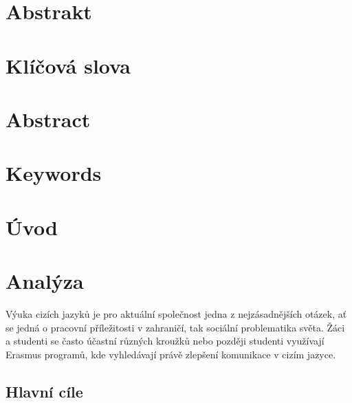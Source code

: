 \documentclass[a4paper,11pt,titlepage,fleqn]{article}
\begin{document}


\setcounter{page}{3}

\newpage
\thispagestyle{plain}
\section*{Abstrakt}

\section*{Klíčová slova}

\thispagestyle{empty}
\newpage

\section*{Abstract}

\section*{Keywords}

\thispagestyle{empty}

\newpage
\setcounter{tocdepth}{2}
\tableofcontents

\newpage
\listoffigures
\listoftables
\lstlistoflistings

\newpage
\printglossary[type=\acronymtype,title=Seznam zkratek]
\cleardoublepage


\section{Úvod}


\newpage
\section{Analýza}
    Výuka cizích jazyků je pro aktuální společnost jedna z nejzásadnějších otázek, ať se jedná o pracovní příležitosti v zahraničí, tak sociální problematika světa. Žáci a studenti se často účastní různých kroužků nebo později studenti využívají Erasmus programů, kde vyhledávají právě zlepšení komunikace v cizím jazyce. 

    \subsection{Hlavní cíle}
        
\end{document}
